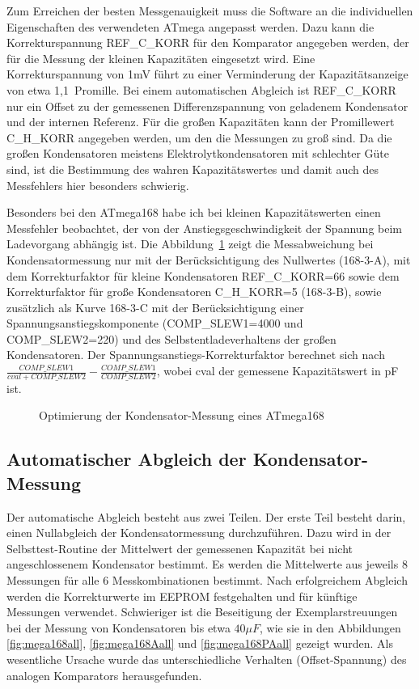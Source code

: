 Zum Erreichen der besten Messgenauigkeit muss die Software an die individuellen Eigenschaften des verwendeten ATmega
angepasst werden. Dazu kann die Korrekturspannung REF\_C\_KORR für den Komparator angegeben werden, der für die Messung der kleinen 
Kapazitäten eingesetzt wird. Eine Korrekturspannung von 1mV führt zu einer Verminderung der Kapazitätsanzeige von etwa 1,1~Promille.
Bei einem automatischen Abgleich ist REF\_C\_KORR  nur ein Offset zu der gemessenen Differenzspannung von geladenem Kondensator
und der internen Referenz.
Für die großen Kapazitäten kann der Promillewert C\_H\_KORR angegeben werden, um den die Messungen
zu groß sind.
Da die großen Kondensatoren meistens Elektrolytkondensatoren mit schlechter Güte sind, ist die Bestimmung
des wahren Kapazitätswertes und damit auch des Messfehlers hier besonders schwierig.

Besonders bei den ATmega168 habe ich bei kleinen Kapazitätswerten einen Messfehler beobachtet, 
der von der Anstiegsgeschwindigkeit der Spannung beim Ladevorgang abhängig ist.
Die Abbildung~\ref{fig:mega168optcap} zeigt die Messabweichung bei Kondensatormessung nur mit der Berücksichtigung des
Nullwertes (168-3-A), mit dem Korrekturfaktor für kleine Kondensatoren REF\_C\_KORR=66 sowie dem Korrekturfaktor für große
Kondensatoren C\_H\_KORR=5 (168-3-B), sowie zusätzlich als Kurve 168-3-C  mit der Berücksichtigung einer Span\-nungs\-an\-stiegs\-kom\-po\-nen\-te 
(COMP\_SLEW1=4000 und COMP\_SLEW2=220) und des Selbst\-ent\-lade\-ver\-hal\-tens der großen Kon\-den\-sa\-toren.
Der Span\-nungs\-an\-stiegs-Kor\-rek\-tur\-faktor berechnet sich nach \(\frac{COMP\_SLEW1}{cval+COMP\_SLEW2} - \frac{COMP\_SLEW1}{COMP\_SLEW2}\),
wobei cval der gemessene Kapazitätswert in pF ist.

\begin{figure}[H]
\centering

\caption{Optimierung der Kondensator-Messung eines ATmega168}
\label{fig:mega168optcap}
\end{figure}

\subsection{Automatischer Abgleich der Kondensator-Messung}

Der automatische Abgleich besteht aus zwei Teilen. Der erste Teil besteht darin, einen Nullabgleich der Kondensatormessung durchzuführen.
Dazu wird in der Selbsttest-Routine der Mittelwert der gemessenen Kapazität bei nicht angeschlossenem Kondensator bestimmt.
Es werden die Mittelwerte aus jeweils 8 Messungen für alle 6 Messkombinationen bestimmt.
Nach erfolgreichem Abgleich werden die Korrekturwerte im EEPROM festgehalten und für künftige Messungen verwendet.
Schwieriger ist die Beseitigung der Exemplarstreuungen bei der Messung von Kondensatoren bis etwa \(40\mu F\), wie sie in den 
Abbildungen \ref{fig:mega168all}, \ref{fig:mega168Aall} und \ref{fig:mega168PAall} gezeigt wurden.
Als wesentliche Ursache wurde das unterschiedliche Verhalten (Offset-Spannung) des analogen Komparators herausgefunden.

